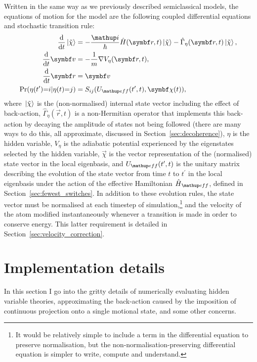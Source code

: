 Written in the same way as we previously described semiclassical models, the equations of motion for the model are the following coupled differential equations and stochastic transition rule:
\begin{align}\label{eq:simple_semiclassical_first}
\dv{t}\ket{\tilde\chi} &= -\frac\ii\hbar \hat H(\vec r, t)\ket{\tilde\chi} - \hat\Gamma_\eta(\vec r, t)\ket{\tilde\chi},\\
\dv{t}\vec v &= -\frac1m\nabla V_\eta(\vec r, t),\\
\dv{t}\vec r &= \vec v\\
\Pr(\eta(t^\prime){=}i|\eta(t){=}j) &= S_{ij}(U_\up{eff}(t^\prime, t), \vec\chi(t)),
\label{eq:hvsc_semiclassical_simple}
\end{align}
where $\ket{\tilde\chi}$ is the (non-normalised) internal state vector including the effect of back-action, $\hat\Gamma_\eta(\vec r, t)$ is a non-Hermitian operator that implements this back-action by decaying the amplitude of states not being followed (there are many ways to do this, all approximate, discussed in Section~\ref{sec:decoherence}), $\eta$ is the hidden variable, $V_\eta$ is the adiabatic potential experienced by the eigenstates selected by the hidden variable, $\vec\chi$ is the vector representation of the (normalised) state vector in the local eigenbasis, and $U_\up{eff}(t^\prime, t)$ is the unitary matrix describing the evolution of the state vector from time $t$ to $t^\prime$ in the local eigenbasis under the action of the effective Hamiltonian $\hat H_\up{eff}$, defined in Section~\ref{sec:fewest_switches}. In addition to these evolution rules, the state vector must be normalised at each timestep of simulation,\footnote{It would be relatively simple to include a term in the differential equation to preserve normalisation, but the non-normalisation-preserving differential equation is simpler to write, compute and understand.} and the velocity of the atom modified instantaneously whenever a transition is made in order to conserve energy. This latter requirement is detailed in Section~\ref{sec:velocity_correction}.

\section{Implementation details}\label{sec:implementation_details}

In this section I go into the gritty details of numerically evaluating hidden variable theories, approximating the back-action caused by the imposition of continuous projection onto a single motional state, and some other concerns.

